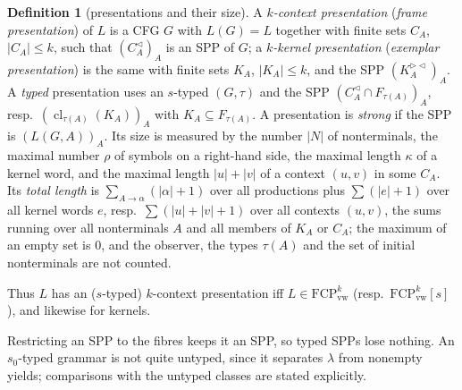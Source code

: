 \documentclass[11pt]{article}
\numberwithin{equation}{section}
\theoremstyle{plain}
\theoremstyle{definition}
\newtheorem{definition}[theorem]{Definition}
\theoremstyle{remark}
\theoremstyle{plain}
\newcommand{\eps}{\lambda}
\newcommand{\Lc}{^{\lhd}}
\newcommand{\RL}{^{\rhd\lhd}}
\newcommand{\cl}{\operatorname{cl}}
\newcommand{\FCP}[2]{\mathrm{FCP}^{#1}_{\mathrm{#2}}}
\newcommand{\tFCP}[3]{\mathrm{FCP}^{#1}_{\mathrm{#2}}[#3]}
\begin{document}
\begin{definition}[presentations and their size]\label{def:presentation}
A \emph{$k$-context presentation} (\emph{frame presentation}) of $L$ is a CFG
$G$ with $L(G)=L$ together with finite sets $C_A$, $|C_A|\le k$, such that
$(C_A\Lc)_A$ is an SPP of $G$; a \emph{$k$-kernel presentation}
(\emph{exemplar presentation}) is the same with finite sets $K_A$,
$|K_A|\le k$, and the SPP $(K_A\RL)_A$.  A \emph{typed} presentation uses an
$s$-typed $(G,\tau)$ and the SPP $(C_A\Lc\cap F_{\tau(A)})_A$, resp.\
$(\cl_{\tau(A)}(K_A))_A$ with $K_A\subseteq F_{\tau(A)}$.  A presentation is
\emph{strong} if the SPP is $(L(G,A))_A$.  Its size is measured by the number
$|N|$ of nonterminals, the maximal number $\rho$ of symbols on a right-hand
side, the maximal length $\kappa$ of a kernel word, and the maximal length
$|u|+|v|$ of a context $(u,v)$ in some $C_A$.  Its \emph{total length} is
$\sum_{A\to\alpha}(|\alpha|+1)$ over all productions plus $\sum(|e|+1)$ over
all kernel words $e$, resp.\ $\sum(|u|+|v|+1)$ over all contexts $(u,v)$,
the sums running over all nonterminals $A$ and all members of $K_A$ or
$C_A$; the maximum of an empty set is $0$, and the observer, the types
$\tau(A)$ and the set of initial nonterminals are not counted.
\end{definition}
Thus $L$ has an ($s$-typed) $k$-context presentation iff
$L\in\FCP{k}{vw}$ (resp.\ $\tFCP{k}{vw}{s}$), and likewise for kernels.

Restricting an SPP to the fibres keeps it an SPP, so typed SPPs lose
nothing.  An $s_0$-typed grammar is not quite untyped, since it separates
$\eps$ from nonempty yields; comparisons with the untyped classes are stated
explicitly.
\end{document}
